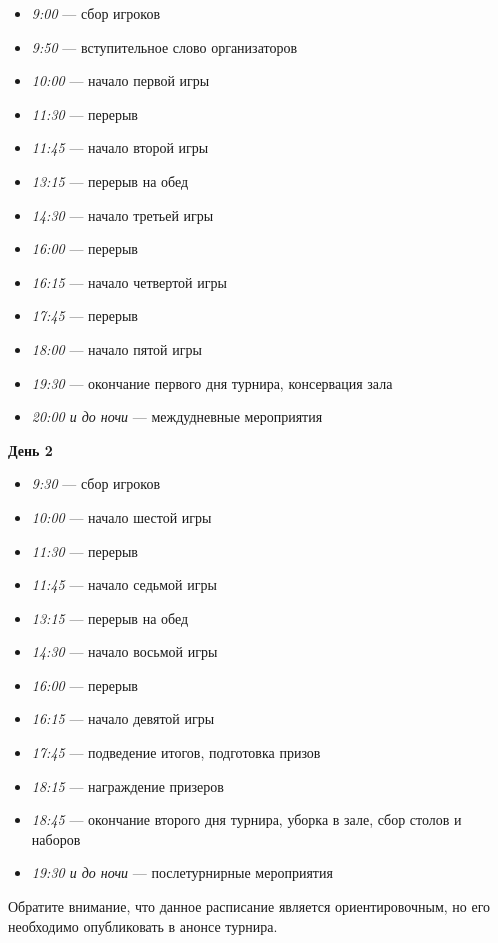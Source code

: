 \begin{itemize}
	\item \textit{9:00} --- сбор игроков
	\item \textit{9:50} --- вступительное слово организаторов
	\item \textit{10:00} --- начало первой игры
	\item \textit{11:30} --- перерыв
	\item \textit{11:45} --- начало второй игры
	\item \textit{13:15} --- перерыв на обед
	\item \textit{14:30} --- начало третьей игры
	\item \textit{16:00} --- перерыв
	\item \textit{16:15} --- начало четвертой игры
	\item \textit{17:45} --- перерыв
	\item \textit{18:00} --- начало пятой игры
	\item \textit{19:30} --- окончание первого дня турнира, консервация зала
	\item \textit{20:00 и до ночи} --- междудневные мероприятия
\end{itemize}

\textbf{День 2}

\begin{itemize}
	\item \textit{9:30} --- сбор игроков
	\item \textit{10:00} --- начало шестой игры
	\item \textit{11:30} --- перерыв
	\item \textit{11:45} --- начало седьмой игры
	\item \textit{13:15} --- перерыв на обед
	\item \textit{14:30} --- начало восьмой игры
	\item \textit{16:00} --- перерыв
	\item \textit{16:15} --- начало девятой игры
	\item \textit{17:45} --- подведение итогов, подготовка призов
	\item \textit{18:15} --- награждение призеров
	\item \textit{18:45} --- окончание второго дня турнира, уборка в зале, сбор столов и наборов
	\item \textit{19:30 и до ночи} --- послетурнирные мероприятия
\end{itemize}

Обратите внимание, что данное расписание является ориентировочным, но его необходимо опубликовать в анонсе турнира.

